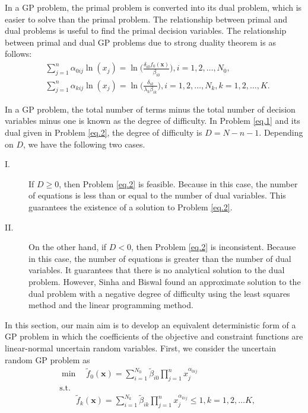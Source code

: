 \par  In a GP problem, the primal problem is converted into its dual problem, which is easier to solve than the primal problem. The relationship between primal and dual problems is useful to find the primal decision variables. The relationship between primal and dual GP problems due to strong duality theorem \cite{Duffin 1967,Duffin 1973} is as follows:
\begin{equation}\label{eq.3}
	\begin{aligned}
		&\sum\limits_{j=1}^n{\alpha_{0ij} } \ln(x_j)=\ln \bigg(\frac{{\delta_{i0}}f_0(\textbf{x}) }{\beta_{i0}}\bigg), i=1,2,\ldots,N_{0},\\
		&\sum\limits_{j=1}^n{\alpha_{kij} } \ln(x_j)=\ln \bigg(\frac{\delta_{ik}} { \lambda_k \beta_{ik}}\bigg),i=1,2,\ldots,N_{k},k=1,2,\ldots,K.
	\end{aligned}
\end{equation}
\begin{remark}
	In a GP problem, the total number of terms minus the total number of decision variables minus one is known as the degree of difficulty. In Problem \ref{eq.1} and its dual given in Problem \ref{eq.2}, the degree of difficulty is $D=N-n-1$. Depending on $D$, we have the following two cases.
\begin{description}
	\item[I.] If $D \geq 0$, then Problem \ref{eq.2} is feasible. Because in this case, the number of equations is less than or equal to the number of dual variables. This guarantees the existence of a solution to Problem \ref{eq.2}. 
		\item[II.] On the other hand, if $D<0$, then Problem \ref{eq.2} is inconsistent. Because in this case, the number of equations is greater than the number of dual variables. It guarantees that there is no analytical solution to the dual problem. However, Sinha and Biswal \cite{sinha 1987} found an approximate solution to the dual problem with a negative degree of difficulty using the least squares method and the linear programming method.
\end{description} 
\end{remark}
\par In this section, our main aim is to develop an equivalent deterministic form of a GP problem in which the coefficients of the objective and constraint functions are linear-normal uncertain random variables. First, we consider the uncertain random GP problem as 
\begin{equation}\label{eq.4}
	\begin{aligned}
		&	\min \quad \tilde{f}_0{(\textbf{x})}=\sum\limits_{i=1}^{N_0}{\tilde{\beta}_{i0}}\prod\limits_{j=1}^{n}x_j^{\alpha_{0ij}}\\
		&	\text{s.t.}\\
		& \qquad \tilde{f}_k{(\textbf{x})}=\sum\limits_{i=1}^{N_k}{\tilde{\beta}_{ik}}\prod\limits_{j=1}^{n}x_j^{\alpha_{kij}}\leq 1,k=1,2,\ldots K,
	\end{aligned}
\end{equation}
